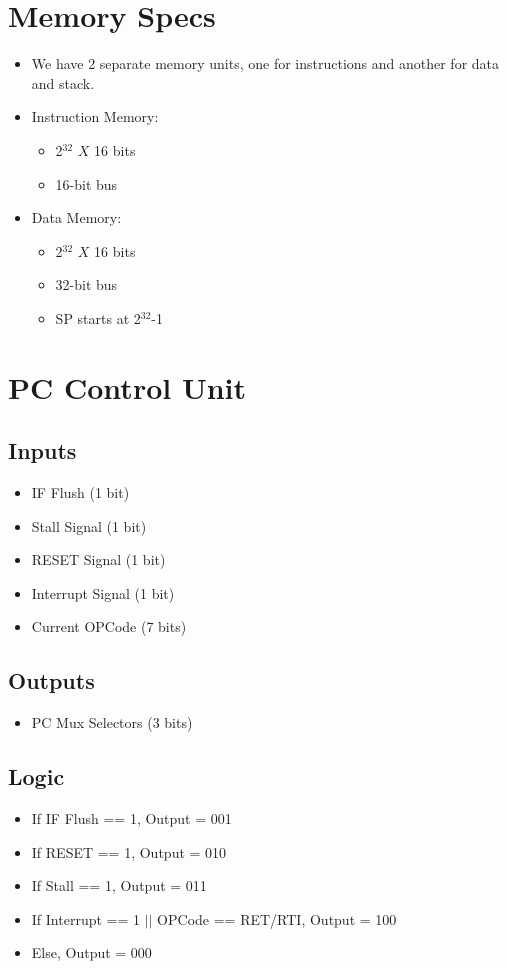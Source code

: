 \documentclass[12pt]{report}
\begin{document}
\section{Memory Specs}
\begin{itemize}
    \item We have 2 separate memory units, one for instructions and another for data and stack.
    \item Instruction Memory:
    \begin{itemize}
        \item 2$^{32}$ $X$ 16 bits
        \item 16-bit bus
    \end{itemize}
    \item Data Memory:
    \begin{itemize}
        \item 2$^{32}$ $X$ 16 bits
        \item 32-bit bus
        \item SP starts at 2$^{32}$-1
    \end{itemize}
\end{itemize}

\section{PC Control Unit}

\subsection{Inputs}
\begin{itemize}
    \item IF Flush (1 bit)
    \item Stall Signal (1 bit)
    \item RESET Signal (1 bit)
    \item Interrupt Signal (1 bit)
    \item Current OPCode (7 bits)
\end{itemize}

\subsection{Outputs}
\begin{itemize}
    \item PC Mux Selectors (3 bits)
\end{itemize}

\subsection{Logic}
\begin{itemize}
    \item If IF Flush == 1, Output = 001
    \item If RESET == 1, Output = 010
    \item If Stall == 1, Output = 011
    \item If Interrupt == 1 $||$ OPCode == RET/RTI, Output = 100
    \item Else, Output = 000
\end{itemize}
\end{document}
